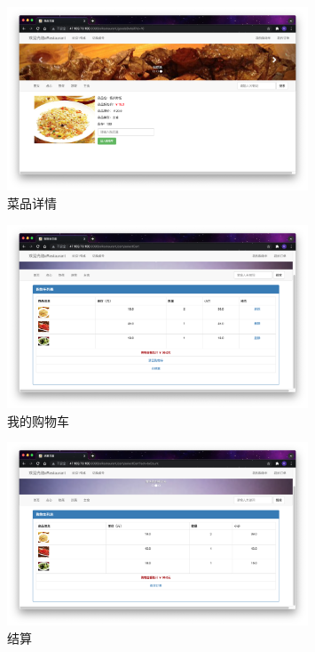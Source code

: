 \documentclass[11pt]{homework}
\begin{document}
    \begin{figure}[h]
      \centering
      \includegraphics[width=0.8\textwidth]{菜品详情}
      \caption{菜品详情}
      \label{菜品详情}
    \end{figure}

    \begin{figure}[h]
      \centering
      \includegraphics[width=0.8\textwidth]{我的购物车}
      \caption{我的购物车}
      \label{我的购物车}
    \end{figure}

    \begin{figure}[h]
      \centering
      \includegraphics[width=0.8\textwidth]{结算}
      \caption{结算}
      \label{结算}
    \end{figure}
\end{document}
